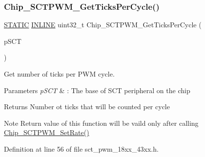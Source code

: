 \subsubsection{\texorpdfstring{Chip\+\_\+\+S\+C\+T\+P\+W\+M\+\_\+\+Get\+Ticks\+Per\+Cycle()}{Chip\_SCTPWM\_GetTicksPerCycle()}}
{\footnotesize\ttfamily \hyperlink{group___l_p_c___types___public___macros_ga10b2d890d871e1489bb02b7e70d9bdfb}{S\+T\+A\+T\+IC} \hyperlink{spifi__18xx__43xx_8h_a2eb6f9e0395b47b8d5e3eeae4fe0c116}{I\+N\+L\+I\+NE} uint32\+\_\+t Chip\+\_\+\+S\+C\+T\+P\+W\+M\+\_\+\+Get\+Ticks\+Per\+Cycle (\begin{DoxyParamCaption}\item[{\hyperlink{struct_l_p_c___s_c_t___t}{L\+P\+C\+\_\+\+S\+C\+T\+\_\+T} $\ast$}]{p\+S\+CT }\end{DoxyParamCaption})}



Get number of ticks per P\+WM cycle. 


\begin{DoxyParams}{Parameters}
{\em p\+S\+CT} & \+: The base of S\+CT peripheral on the chip \\
\hline
\end{DoxyParams}
\begin{DoxyReturn}{Returns}
Number ot ticks that will be counted per cycle 
\end{DoxyReturn}
\begin{DoxyNote}{Note}
Return value of this function will be vaild only after calling \hyperlink{group___s_c_t___p_w_m__18_x_x__43_x_x_gadbcc6b9f14952ee1b2f293521918755a}{Chip\+\_\+\+S\+C\+T\+P\+W\+M\+\_\+\+Set\+Rate()} 
\end{DoxyNote}


Definition at line 56 of file sct\+\_\+pwm\+\_\+18xx\+\_\+43xx.\+h.

\mbox{\label{group___s_c_t___p_w_m__18_x_x__43_x_x_gab977afb29a407437f574b822fa71af62}} 
